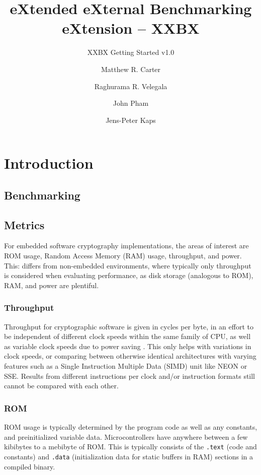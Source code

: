 \documentclass[twoside,11pt]{cergdoc}
\begin{document}
\title{eXtended eXternal Benchmarking eXtension -- XXBX}
\subtitle{XXBX Getting Started v1.0}
\author{Matthew R. Carter \and Raghurama R. Velegala \and John Pham \and Jens-Peter Kaps}

\maketitle

\tableofcontents

\chapter{Introduction}
  \section{Benchmarking}
  \section{Metrics}
For embedded software cryptography implementations, the areas of interest are
ROM usage, Random Access Memory (RAM) usage, throughput, and power. This:
differs from non-embedded environments, where typically only throughput is
considered when evaluating performance, as disk storage (analogous to ROM), RAM,
and power are plentiful.  

    \subsection{Throughput}
Throughput for cryptographic software is given in cycles per byte, in an effort
to be independent of different clock speeds within the same family of CPU, as
well as variable clock speeds due to power saving \cite{sha3bench}. This only
helps with variations in clock speeds, or comparing between otherwise identical
architectures with varying features such as a Single Instruction Multiple Data
(SIMD) unit like NEON or SSE. Results from different
instructions per clock and/or instruction formats still cannot be compared with
each other.

    \subsection{ROM}
ROM usage is typically determined by the program code as well as any constants,
and preinitialized variable data. Microcontrollers have anywhere between
a few kibibytes to a mebibyte of ROM. This is typically consists of the 
\texttt{.text} (code and constants) and \texttt{.data} (initialization data for
static buffers in RAM) sections in a compiled binary.
\end{document}
